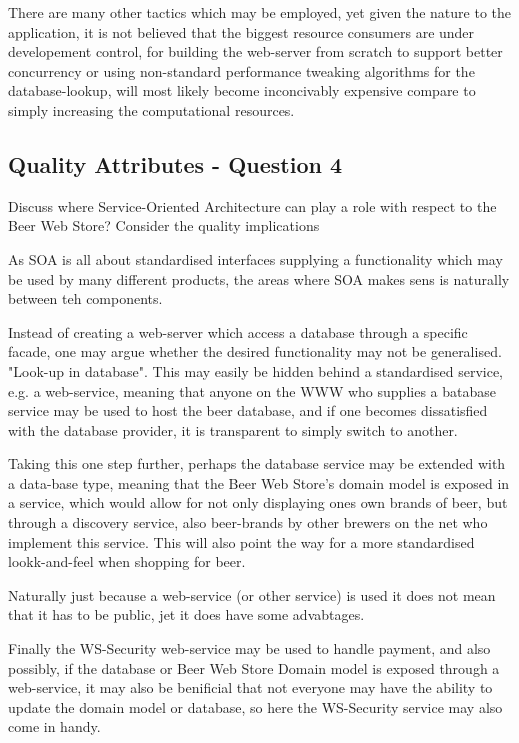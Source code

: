 There are many other tactics which may be employed, yet given the nature to the application, it is not believed that the biggest resource consumers are under developement control, for building the web-server from scratch to support better concurrency or using non-standard performance tweaking algorithms for the database-lookup, will most likely become inconcivably expensive compare to simply increasing the computational resources.

\subsection{Quality Attributes - Question 4}

\begin{question}
Discuss where Service-Oriented Architecture can play a role
with respect to the Beer Web Store? Consider the quality implications
\end{question}

As SOA is all about standardised interfaces supplying a functionality which may be used by many different products, the areas where SOA makes sens is naturally between teh components. 

Instead of creating a web-server which access a database through a specific facade, one may argue whether the desired functionality may not be generalised. "Look-up in database". This may easily be hidden behind a standardised service, e.g. a web-service, meaning that anyone on the WWW who supplies a batabase service may be used to host the beer database, and if one becomes dissatisfied with the database provider, it is transparent to simply switch to another. 

Taking this one step further, perhaps the database service may be extended with a data-base type, meaning that the Beer Web Store's domain model is exposed in a service, which would allow for not only displaying ones own brands of beer, but through a discovery service, also beer-brands by other brewers on the net who implement this service. This will also point the way for a more standardised lookk-and-feel when shopping for beer.

Naturally just because a web-service (or other service) is used it does not mean that it has to be public, jet it does have some advabtages.

Finally the WS-Security web-service may be used to handle payment, and also possibly, if the database or Beer Web Store Domain model is exposed through a web-service, it may also be benificial that not everyone may have the ability to update the domain model or database, so here the WS-Security service may also come in handy.

